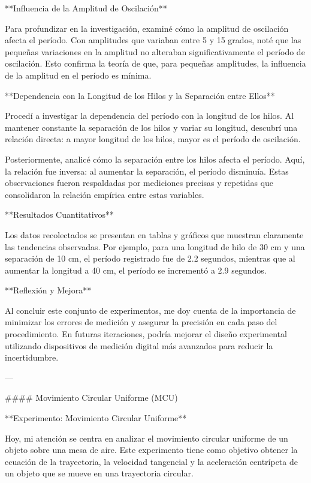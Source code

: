 \documentclass[journal]{IEEEtran}
\begin{document}
**Influencia de la Amplitud de Oscilación**

Para profundizar en la investigación, examiné cómo la amplitud de oscilación afecta el período. Con amplitudes que variaban entre 5 y 15 grados, noté que las pequeñas variaciones en la amplitud no alteraban significativamente el período de oscilación. Esto confirma la teoría de que, para pequeñas amplitudes, la influencia de la amplitud en el período es mínima.

**Dependencia con la Longitud de los Hilos y la Separación entre Ellos**

Procedí a investigar la dependencia del período con la longitud de los hilos. Al mantener constante la separación de los hilos y variar su longitud, descubrí una relación directa: a mayor longitud de los hilos, mayor es el período de oscilación. 

Posteriormente, analicé cómo la separación entre los hilos afecta el período. Aquí, la relación fue inversa: al aumentar la separación, el período disminuía. Estas observaciones fueron respaldadas por mediciones precisas y repetidas que consolidaron la relación empírica entre estas variables.

**Resultados Cuantitativos**

Los datos recolectados se presentan en tablas y gráficos que muestran claramente las tendencias observadas. Por ejemplo, para una longitud de hilo de 30 cm y una separación de 10 cm, el período registrado fue de 2.2 segundos, mientras que al aumentar la longitud a 40 cm, el período se incrementó a 2.9 segundos.

**Reflexión y Mejora**

Al concluir este conjunto de experimentos, me doy cuenta de la importancia de minimizar los errores de medición y asegurar la precisión en cada paso del procedimiento. En futuras iteraciones, podría mejorar el diseño experimental utilizando dispositivos de medición digital más avanzados para reducir la incertidumbre.

---

#### Movimiento Circular Uniforme (MCU)

**Experimento: Movimiento Circular Uniforme**

Hoy, mi atención se centra en analizar el movimiento circular uniforme de un objeto sobre una mesa de aire. Este experimento tiene como objetivo obtener la ecuación de la trayectoria, la velocidad tangencial y la aceleración centrípeta de un objeto que se mueve en una trayectoria circular.
\end{document}
